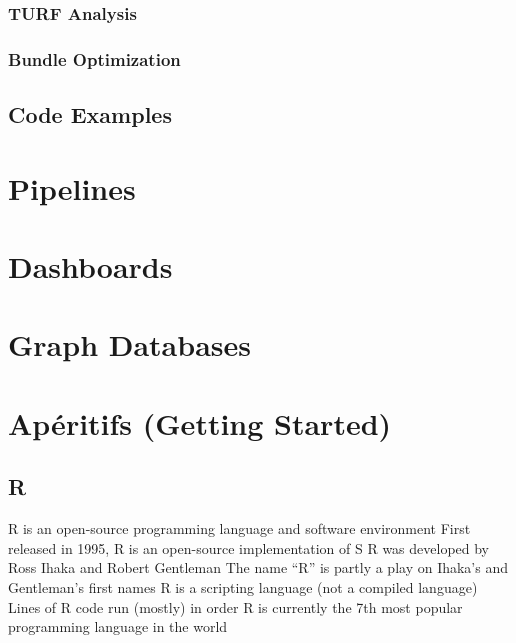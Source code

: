 \documentclass[
]{book}
\begin{document}
\hypertarget{turf-analysis}{%
\subsection{TURF Analysis}\label{turf-analysis}}

\hypertarget{bundle-optimization}{%
\subsection{Bundle Optimization}\label{bundle-optimization}}

\hypertarget{code-examples-2}{%
\section{Code Examples}\label{code-examples-2}}

\hypertarget{pipelines}{%
\chapter{Pipelines}\label{pipelines}}

\hypertarget{dashboards}{%
\chapter{Dashboards}\label{dashboards}}

\hypertarget{graph-db}{%
\chapter{Graph Databases}\label{graph-db}}

\hypertarget{appendix-appendix}{%
\appendix}


\hypertarget{start-R}{%
\chapter{Apéritifs (Getting Started)}\label{start-R}}

\hypertarget{r}{%
\section{R}\label{r}}

R is an open-source programming language and software environment
First released in 1995, R is an open-source implementation of S
R was developed by Ross Ihaka and Robert Gentleman
The name ``R'' is partly a play on Ihaka's and Gentleman's first names
R is a scripting language (not a compiled language)
Lines of R code run (mostly) in order
R is currently the 7th most popular programming language in the world
\end{document}

